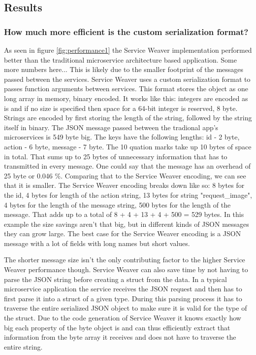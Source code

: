 \documentclass[sigconf,review,9pt]{acmart}
\begin{document}
\subsection{Results}

\subsubsection{How much more efficient is the custom serialization format?}

As seen in figure \ref{fig:performance1} the Service Weaver implementation performed
better than the traditional microservice architecture based application.
Some more numbers here...
This is likely due to the smaller footprint of the messages passed between the services.
Service Weaver uses a custom serialization format to passes function arguments between services.
This format stores the object as one long array in memory, binary encoded.
It works like this: integers are encoded as is and if no size is specified then
space for a 64-bit integer is reserved, 8 byte.
Strings are encoded by first storing the length of the string, followed by the string
itself in binary.
The JSON message passed between the tradional app's microservices is 549 byte big.
The keys have the following lengths: id - 2 byte, action - 6 byte, message - 7 byte.
The 10 quation marks take up 10 bytes of space in total.
That sums up to 25 bytes of unnecessary information that has to transmitted in every message.
One could say that the message has an overhead of 25 byte or 0.046 \%.
Comparing that to the Service Weaver encoding, we can see that it is smaller.
The Service Weaver encoding breaks down like so: 8 bytes for the id, 4 bytes for length
of the action string, 13 bytes for string "request\_image", 4 bytes for the length
of the message string, 500 bytes for the length of the message.
That adds up to a total of 8 + 4 + 13 + 4 + 500 = 529 bytes.
In this example the size savings aren't that big, but in different kinds of JSON messages
they can grow large.
The best case for the Service Weaver encoding is a JSON message with a lot of fields
with long names but short values.

The shorter message size isn't the only contributing factor to the higher Service Weaver
performance though.
Service Weaver can also save time by not having to parse the JSON string before
creating a struct from the data.
In a typical microservice application the service receives the JSON request and
then has to first parse it into a struct of a given type.
During this parsing process it has to traverse the entire serialized JSON object
to make sure it is valid for the type of the struct.
Due to the code generation of Service Weaver it knows exactly how big each property
of the byte object is and can thus efficiently extract that information from the
byte array it receives and does not have to traverse the entire string.
\end{document}
